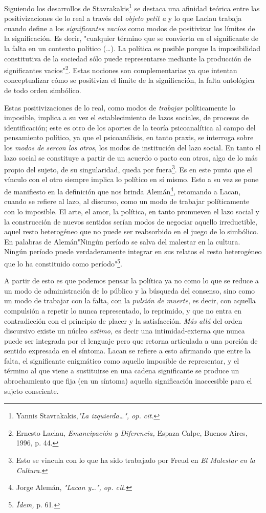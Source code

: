 \documentclass{book}
\begin{document}
Siguiendo los desarrollos de Stavrakakis\footnote{Yannis
  Stavrakakis,\emph{"La izquierda\ldots", op. cit.}} se destaca una
afinidad teórica entre las positivizaciones de lo real a través del
\emph{objeto petit a} y lo que Laclau trabaja cuando define a los
\emph{significantes vacíos} como modos de positivizar los límites de la
significación. Es decir, "cualquier término que se convierta en el
significante de la falta en un contexto político (\dots). La
política es posible porque la imposibilidad constitutiva de la sociedad
sólo puede representarse mediante la producción de significantes
vacíos"\footnote{Ernesto Laclau, \emph{Emancipación y Diferencia,}
  Espaza Calpe, Buenos Aires, 1996, p. 44.}. Estas nociones son
complementarias ya que intentan conceptualizar cómo se positiviza el
límite de la significación, la falta ontológica de todo orden simbólico.

Estas positivizaciones de lo real, como modos de \emph{trabajar}
políticamente lo imposible, implica a su vez el establecimiento de lazos
sociales, de procesos de identificación; este es otro de los aportes de
la teoría psicoanalítica al campo del pensamiento político, ya que el
psicoanálisis, en tanto praxis, se interroga sobre los \emph{modos de
sercon los otros}, los modos de institución del lazo social. En tanto el
lazo social se constituye a partir de un acuerdo o pacto con otros, algo
de lo más propio del sujeto, de su singularidad, queda por
fuera\footnote{Esto se vincula con lo que ha sido trabajado por Freud en
  \emph{El Malestar en la Cultura.}}. Es en este punto que el vínculo
con el otro siempre implica lo político en sí mismo. Esto a su vez se
pone de manifiesto en la definición que nos brinda Alemán\footnote{Jorge
  Alemán, \emph{"Lacan y\ldots", op. cit.}}, retomando a Lacan, cuando
se refiere al lazo, al discurso, como un modo de trabajar políticamente
con lo imposible. El arte, el amor, la política, en tanto promueven el
lazo social y la construcción de nuevos sentidos serían modos de
negociar aquello irreductible, aquel resto heterogéneo que no puede ser
reabsorbido en el juego de lo simbólico. En palabras de Alemán"Ningún
período se salva del malestar en la cultura. Ningún período puede
verdaderamente integrar en sus relatos el resto heterogéneo que lo ha
constituido como período"\footnote{\emph{Ídem,} p. 61.}.

A partir de esto es que podemos pensar la política ya no como lo que se
reduce a un modo de administración de lo público y la búsqueda del
consenso, sino como un modo de trabajar con la falta, con la
\emph{pulsión de muerte}, es decir, con aquella compulsión a repetir lo
nunca representado, lo reprimido, y que no entra en contradicción con el
principio de placer y la satisfacción. \emph{Más allá} del orden
discursivo existe un núcleo \emph{extimo,} es decir una
intimidad-externa que nunca puede ser integrada por el lenguaje pero que
retorna articulada a una porción de sentido expresada en el síntoma.
Lacan se refiere a esto afirmando que entre la falta, el significante
enigmático como aquello imposible de representar, y el término al que
viene a sustituirse en una cadena significante se produce un
abrochamiento que fija (en un síntoma) aquella significación inaccesible
para el sujeto consciente.
\end{document}
